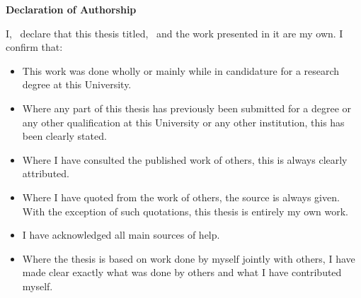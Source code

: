 %
%
%
%
%

\thispagestyle{empty} %
\begin{center}
	\textbf{Declaration of Authorship}
\end{center}

	I, \authorName\, declare that this thesis titled, \thesisTitle\ and the 
	work presented in it are my own. I confirm that:

\begin{center}
\end{center}

\begin{itemize}
	\item This work was done wholly or mainly while in candidature for a research degree 
	at this University.
	\item Where any part of this thesis has previously been submitted for a degree or any 
	other qualification at this University or any other institution, this has been clearly 
	stated.
	\item Where I have consulted the published work of others, this is always clearly 
	attributed.
	\item Where I have quoted from the work of others, the source is always given. With 
	the exception of such quotations, this thesis is entirely my own work.
	\item I have acknowledged all main sources of help.
	\item Where the thesis is based on work done by myself jointly with others, I have 
	made clear exactly what was done by others and what I have contributed myself.
\end{itemize}

\begin{center}
\end{center}

